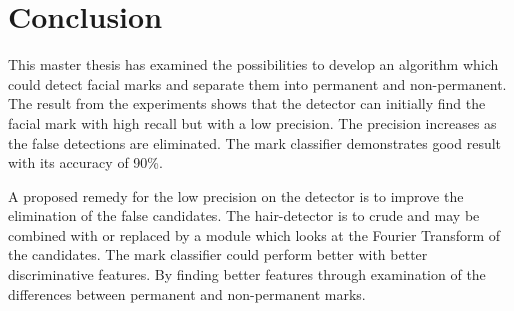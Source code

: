 \chapter{Conclusion}\label{cha:conclusion}

This master thesis has examined the possibilities to develop an algorithm which could detect facial marks and separate them into permanent and non-permanent. The result from the experiments shows that the detector can initially find the facial mark with high recall but with a low precision. The precision increases as the false detections are eliminated. The mark classifier demonstrates good result with its accuracy of 90\%.  

A proposed remedy for the low precision on the detector is to improve the elimination of the false candidates. The hair-detector is to crude and may be combined with or replaced by a module which looks at the Fourier Transform of the candidates. The mark classifier could perform better with better discriminative features. By finding better features through examination of the differences between permanent and non-permanent marks.
